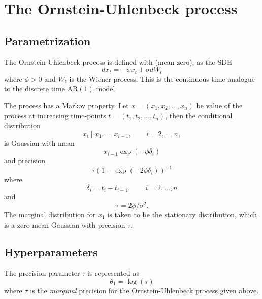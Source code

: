 \documentclass[a4paper,11pt]{article}
\begin{document}
\section*{The Ornstein-Uhlenbeck process}

\subsection*{Parametrization}

The Ornstein-Uhlenbeck process is defined with (mean zero), as the SDE
\begin{displaymath}
    dx_{t} = -\phi x_{t} + \sigma dW_{t}
\end{displaymath}
where $\phi>0$ and $W_{t}$ is the Wiener process. This is the
continuous time analogue to the discrete time AR$(1)$ model.

The process has a Markov property. Let ${x} = (x_{1}, x_{2}, \ldots,
x_{n})$ be value of the process at increasing time-points ${t} =
(t_{1}, t_{2}, \ldots, t_{n})$, then the conditional distribution
\begin{displaymath}
    x_{i} \mid x_{1},  \ldots, x_{i-1}, \qquad i=2, \ldots, n,
\end{displaymath}
is Gaussian with mean
\begin{displaymath}
    x_{i-1} \exp(-\phi \delta_{i})
\end{displaymath}
and precision
\begin{displaymath}
    \tau\left(1-\exp(-2\phi \delta_{i})
    \right)^{-1}
\end{displaymath}
where
\begin{displaymath}
    \delta_{i} = t_{i} - t_{i-1},\qquad i=2,\ldots, n
\end{displaymath}
and
\begin{displaymath}
    \tau = 2\phi/\sigma^{2}.
\end{displaymath}
The marginal distribution for $x_{1}$ is taken to be the stationary
distribution, which is a zero mean Gaussian with precision $\tau$.

\subsection*{Hyperparameters}

The precision parameter $\tau$ is represented as
\begin{displaymath}
    \theta_1 =\log(\tau) 
\end{displaymath}
where $\tau$ is the \emph{marginal} precision for the
Ornstein-Uhlenbeck process given above.
\end{document}
